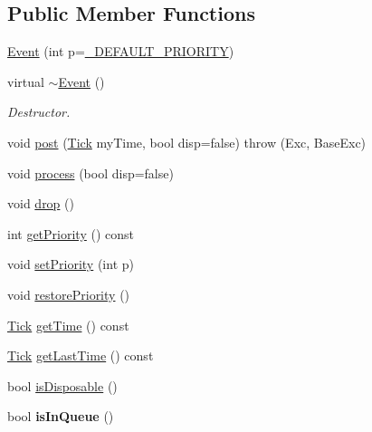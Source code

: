 \subsection*{Public Member Functions}
\begin{DoxyCompactItemize}
\item 
\hyperlink{classMetaSim_1_1Event_a23c5dbc772857f44d0b6d7d1cad96e7b}{Event} (int p=\hyperlink{classMetaSim_1_1Event_a93a8a4b3c1db0fdd2fadd7345f0b8c42}{\+\_\+\+D\+E\+F\+A\+U\+L\+T\+\_\+\+P\+R\+I\+O\+R\+I\+TY})
\item 
virtual \hyperlink{classMetaSim_1_1Event_a7a72fa23967ca550df91a0de8237d761}{$\sim$\+Event} ()\hypertarget{classMetaSim_1_1Event_a7a72fa23967ca550df91a0de8237d761}{}\label{classMetaSim_1_1Event_a7a72fa23967ca550df91a0de8237d761}

\begin{DoxyCompactList}\small\item\em Destructor. \end{DoxyCompactList}\item 
void \hyperlink{classMetaSim_1_1Event_adc72458c7ea70de9f0c5420f5c66da38}{post} (\hyperlink{classMetaSim_1_1Tick}{Tick} my\+Time, bool disp=false)  throw (\+Exc, Base\+Exc)
\item 
void \hyperlink{classMetaSim_1_1Event_a91bd2cdec52ef9c4c5d37f88bafc61f8}{process} (bool disp=false)
\item 
void \hyperlink{classMetaSim_1_1Event_aa6d5f03efdac6b23021db1356e366c06}{drop} ()
\item 
int \hyperlink{classMetaSim_1_1Event_afa08e9ffb49a6a04844637ee8fde19a9}{get\+Priority} () const 
\item 
void \hyperlink{classMetaSim_1_1Event_ab6d9e0db7624820e6a42516ddd49fa16}{set\+Priority} (int p)
\item 
void \hyperlink{classMetaSim_1_1Event_a3ead7ca3d7f1ebb7ea4eb2e3b8a3f509}{restore\+Priority} ()
\item 
\hyperlink{classMetaSim_1_1Tick}{Tick} \hyperlink{classMetaSim_1_1Event_a2f95f50d8b12694b31ee75acd974f9c3}{get\+Time} () const 
\item 
\hyperlink{classMetaSim_1_1Tick}{Tick} \hyperlink{classMetaSim_1_1Event_abe006d0e571f373db76db13f72148d97}{get\+Last\+Time} () const 
\item 
bool \hyperlink{classMetaSim_1_1Event_a272d8617d3d9c5e89b5e78aae6845dd0}{is\+Disposable} ()
\item 
bool {\bfseries is\+In\+Queue} ()\hypertarget{classMetaSim_1_1Event_a69a950f4b4ba615e3d5aa9496f9077c2}{}\label{classMetaSim_1_1Event_a69a950f4b4ba615e3d5aa9496f9077c2}


\end{DoxyCompactItemize}
